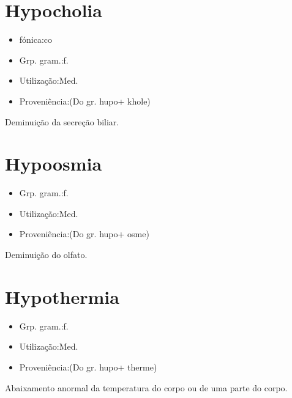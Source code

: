 \documentclass{article}
\begin{document}
\section{Hypocholia}
\begin{itemize}
\item {fónica:co}
\end{itemize}
\begin{itemize}
\item {Grp. gram.:f.}
\end{itemize}
\begin{itemize}
\item {Utilização:Med.}
\end{itemize}
\begin{itemize}
\item {Proveniência:(Do gr. \textunderscore hupo\textunderscore  + \textunderscore khole\textunderscore )}
\end{itemize}
Deminuição da secreção biliar.
\section{Hypoosmia}
\begin{itemize}
\item {Grp. gram.:f.}
\end{itemize}
\begin{itemize}
\item {Utilização:Med.}
\end{itemize}
\begin{itemize}
\item {Proveniência:(Do gr. \textunderscore hupo\textunderscore  + \textunderscore osme\textunderscore )}
\end{itemize}
Deminuição do olfato.
\section{Hypothermia}
\begin{itemize}
\item {Grp. gram.:f.}
\end{itemize}
\begin{itemize}
\item {Utilização:Med.}
\end{itemize}
\begin{itemize}
\item {Proveniência:(Do gr. \textunderscore hupo\textunderscore  + \textunderscore therme\textunderscore )}
\end{itemize}
Abaixamento anormal da temperatura do corpo ou de uma parte do corpo.
\end{document}
